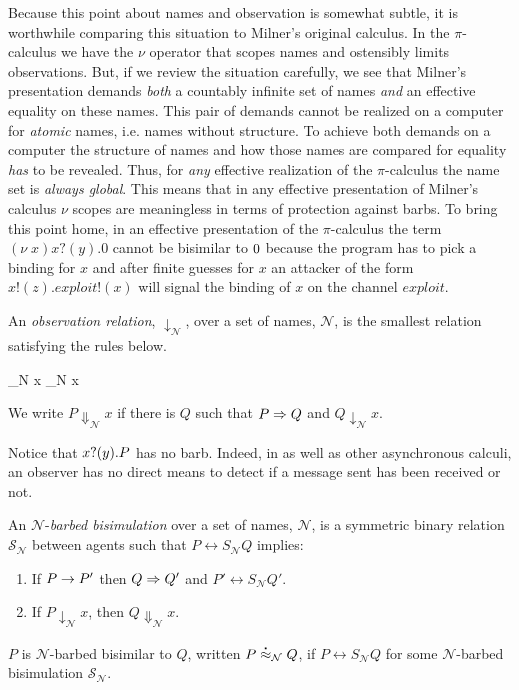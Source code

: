 \begin{remark}
  Because this point about names and observation is somewhat subtle,
  it is worthwhile comparing this situation to Milner's original
  calculus. In the $\pi$-calculus we have the $\nu$ operator that
  scopes names and ostensibly limits observations. But, if we review
  the situation carefully, we see that Milner's presentation demands
  \emph{both} a countably infinite set of names \emph{and} an
  effective equality on these names. This pair of demands cannot be
  realized on a computer for \emph{atomic} names, i.e. names without
  structure. To achieve both demands on a computer the structure of
  names and how those names are compared for equality \emph{has} to be
  revealed. Thus, for \emph{any} effective realization of the
  $\pi$-calculus the name set is \emph{always global}. This means that
  in any effective presentation of Milner's calculus $\nu$ scopes are
  meaningless in terms of protection against barbs. To bring this
  point home, in an effective presentation of the $\pi$-calculus the
  term $(\nu \; x)x?(y).0$ cannot be bisimilar to $\mathbin{0}$ because the
  program has to pick a binding for $x$ and after finite guesses for
  $x$ an attacker of the form $x!(z).exploit!(x)$ will signal the
  binding of $x$ on the channel $exploit$.
\end{remark}

\begin{definition}
An \emph{observation relation}, $\downarrow_{\mathcal N}$, over a set
of names, $\mathcal N$, is the smallest relation satisfying the rules
below.

		  { \downarrow_{\mathcal N} x}
		  { \downarrow_{\mathcal N} x}

We write $P \Downarrow_{\mathcal N} x$ if there is $Q$ such that 
$P \Rightarrow Q$ and $Q \downarrow_{\mathcal N} x$.
\end{definition}

Notice that $x ?( y ) . P$ has no barb.  Indeed, in {\rhoc} as well
as other asynchronous calculi, an observer has no direct means to
detect if a message sent has been received or not.

\begin{definition}
An  ${\mathcal N}$-\emph{barbed bisimulation} over a set of names, ${\mathcal N}$, is a symmetric binary relation 
${\mathcal S}_{\mathcal N}$ between agents such that $P\rel{S}_{\mathcal N}Q$ implies:
\begin{enumerate}
\item If $P \rightarrow P'$ then $Q \Rightarrow Q'$ and $P'\rel{S}_{\mathcal N} Q'$.
\item If $P\downarrow_{\mathcal N} x$, then $Q\Downarrow_{\mathcal N} x$.
\end{enumerate}
$P$ is ${\mathcal N}$-barbed bisimilar to $Q$, written
$P \stackrel{\centerdot}{\approx}_{\mathcal N} Q$, if $P \rel{S}_{\mathcal N} Q$ for some ${\mathcal N}$-barbed bisimulation ${\mathcal S}_{\mathcal N}$.
\end{definition}

